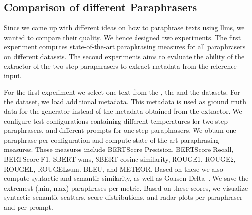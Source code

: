 \subsection{Comparison of different Paraphrasers}
\label{subsec:comp_paraphrasers_setup}

Since we came up with different ideas on how to paraphrase texts using \acp{llm}, we wanted to compare their quality.
We hence designed two experiments.
The first experiment computes state-of-the-art paraphrasing measures for all paraphrasers on different datasets.
The second experiments aims to evaluate the ability of the extractor of the two-step paraphrasers to extract metadata from the reference input.

For the first experiment we select one text from the \dataBlog{}, the \dataGutenberg{} and the \dataStudent{} datasets.
For the \dataGutenberg{} dataset, we load additional metadata.
This metadata is used as ground truth data for the generator instead of the metadata obtained from the extractor.
We configure test configurations containing different temperatures for two-step paraphrasers, and different prompts for one-step paraphrasers.
We obtain one paraphrase per configuration and compute state-of-the-art paraphrasing measures.
These measures include BERTScore Precision, BERTScore Recall, BERTScore F1, SBERT \ac{wms}, SBERT cosine similarity, ROUGE1, ROUGE2, ROUGEL, ROUGELsum, BLEU, and METEOR.
Based on these we also compute syntactic and semantic similarity, as well as Gohsen Delta~\citep{gohsen_captions_2023}.
We save the extremest (min, max) paraphrases per metric.
Based on these scores, we visualize syntactic-semantic scatters, score distributions, and radar plots per paraphraser and per prompt. 


